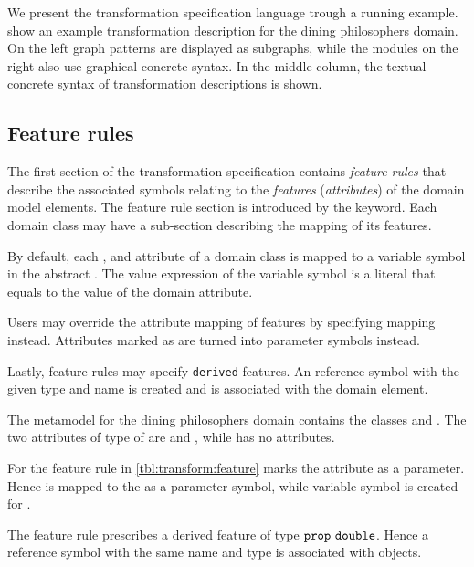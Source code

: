 We present the transformation specification language trough a running example.  show an example transformation description for the dining philosophers domain. On the left graph patterns are displayed as subgraphs, while the  modules on the right also use graphical concrete syntax. In the middle column, the textual concrete syntax of transformation descriptions is shown.

\subsection{Feature rules}

The first section of the transformation specification contains \emph{feature rules} that describe the associated symbols relating to the \emph{features} (\emph{attributes}) of the domain model elements. The feature rule section is introduced by the  keyword. Each domain class may have a sub-section describing the mapping of its features.

By default, each ,  and  attribute of a domain class is mapped to a  variable symbol in the abstract . The value expression of the variable symbol is a literal that equals to the value of the domain attribute.

Users may override the attribute mapping of  features by specifying  mapping instead. Attributes marked as  are turned into parameter symbols instead.

Lastly, feature rules may specify \texttt{derived} features. An  reference symbol with the given type and name is created and is associated with the domain element.

\begin{runningExample}
  The metamodel for the dining philosophers domain contains the classes  and . The two attributes of type  of  are  and , while  has no attributes.

  For  the feature rule in \vref{tbl:transform:feature} marks the attribute  as a parameter. Hence  is mapped to the  as a parameter symbol, while  variable symbol is created for .

  The  feature rule prescribes a derived feature  of type \(\texttt{\upshape prop}\ \texttt{\upshape double}\). Hence a reference symbol with the same name and type is associated with  objects.
\end{runningExample}

